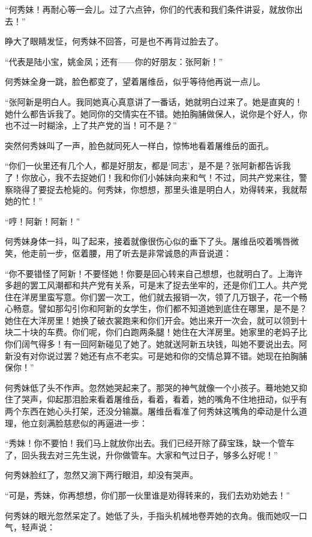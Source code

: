 \par “何秀妹！再耐心等一会儿。过了六点钟，你们的代表和我们条件讲妥，就放你出去！”
\par 睁大了眼睛发怔，何秀妹不回答，可是也不再背过脸去了。
\par “代表是陆小宝，姚金凤；还有——你的好朋友：张阿新！”
\par 何秀妹全身一跳，脸色都变了，望着屠维岳，似乎等待他再说一点儿。
\par “张阿新是明白人。我同她真心真意讲了一番话，她就明白过来了。她是直爽的！她什么都告诉我了。她同你的交情实在不错。她拍胸脯做保人，说你是个好人，你也不过一时糊涂，上了共产党的当！可不是？”
\par 突然何秀妹叫了一声，脸色就同死人一样白，惊怖地看着屠维岳的面孔。
\par “你们一伙里还有几个人，都是好朋友，都是‘同志’，是不是？张阿新都告诉我了！你放心，我不去捉她们！我和你们小姊妹向来和气！不过，同共产党来往，警察晓得了要捉去枪毙的。何秀妹，你想想，那里头谁是明白人，劝得转来，我就帮她的忙！”
\par “哼！阿新！阿新！”
\par 何秀妹身体一抖，叫了起来，接着就像很伤心似的垂下了头。屠维岳咬着嘴唇微笑，他走前一步，伛着腰，用了听去是非常诚恳的声音说道：
\par “你不要错怪了阿新！不要怪她！你要是回心转来自己想想，也就明白了。上海许多趟的罢工风潮都和共产党有关系，可是末了捉去坐牢的，还是你们工人。共产党住在洋房里蛮写意。你们罢一次工，他们就去报销一次，领了几万银子，花一个畅心畅意。譬如那勾引你和阿新的女学生，你们都不知道她到底住在哪里，是不是？她住在大洋房里！她换了破衣裳跑来和你们开会。她出来开一次会，就可以领到十块二十块的车费。你们呢，你们白跑两条腿！她住在大洋房里。她家里的老妈子比你们阔气得多！有一回阿新碰见了她了。她就送阿新五块钱，叫她不要说出去。阿新没有对你说过罢？她还有点不老实。可是她和你的交情总算不错。她现在拍胸脯保你！”
\par 何秀妹低了头不作声。忽然她哭起来了。那哭的神气就像一个小孩子。蓦地她又抑住了哭声，仰起那泪脸来看着屠维岳，看着，看着，她的嘴角不住地扭动，似乎有两个东西在她心头打架，还没分输赢。屠维岳看准了何秀妹这嘴角的牵动是什么道理，他立刻满脸慈悲似的再逼进一步：
\par “秀妹！你不要怕！我们马上就放你出去。我们已经开除了薛宝珠，缺一个管车了，回头我去对三先生说，升你做管车。大家和气过日子，够多么好呢！”
\par 何秀妹脸红了，忽然又淌下两行眼泪，却没有哭声。
\par “可是，秀妹，你再想想，你们那一伙里谁是劝得转来的，我们去劝劝她去！”
\par 何秀妹的眼光忽然呆定了。她低了头，手指头机械地卷弄她的衣角。俄而她叹一口气，轻声说：
